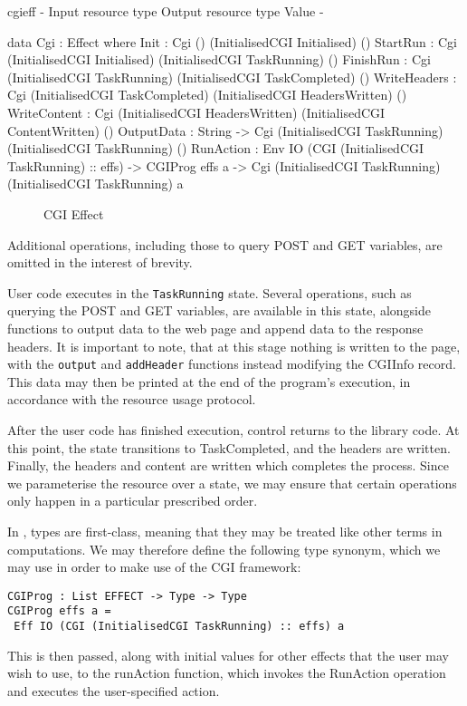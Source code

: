 \begin{SaveVerbatim}{cgieff}
{-                     { Input resource type }         { Output resource type }        { Value } -}

data Cgi : Effect where
    Init         : Cgi ()                              (InitialisedCGI Initialised)    ()
    StartRun     : Cgi (InitialisedCGI Initialised)    (InitialisedCGI TaskRunning)    ()
    FinishRun    : Cgi (InitialisedCGI TaskRunning)    (InitialisedCGI TaskCompleted)  ()
    WriteHeaders : Cgi (InitialisedCGI TaskCompleted)  (InitialisedCGI HeadersWritten) ()
    WriteContent : Cgi (InitialisedCGI HeadersWritten) (InitialisedCGI ContentWritten) ()
    OutputData   : String -> 
                   Cgi (InitialisedCGI TaskRunning)    (InitialisedCGI TaskRunning)    ()
    RunAction    : Env IO (CGI (InitialisedCGI TaskRunning) :: effs) -> CGIProg effs a -> 
                   Cgi (InitialisedCGI TaskRunning)    (InitialisedCGI TaskRunning)    a
\end{SaveVerbatim}

\begin{figure*}[t]
\begin{center}
\end{center}
\caption{CGI Effect}
\label{fig:cgieffect}
\end{figure*}

Additional operations, including those to query POST and GET variables, are omitted in the interest of brevity.

User code executes in the \texttt{TaskRunning} state. Several operations, such as querying the POST and GET variables, are available in this state, alongside functions to output data to the web page and append data to the response headers. It is important to note, that at this stage nothing is written to the page, with the \texttt{output} and \texttt{addHeader} functions instead modifying the CGIInfo record. This data may then be printed at the end of the program's execution, in accordance with the resource usage protocol.

After the user code has finished execution, control returns to the library code. At this point, the state transitions to TaskCompleted, and the headers are written.
Finally, the headers and content are written which completes the process. Since we parameterise the resource over a state, we may ensure that certain operations only happen in a particular prescribed order.

In \idris{}, types are first-class, meaning that they may be treated like other terms in computations. We may therefore define the following type synonym, which we may use in order to make use of the CGI framework: 
\begin{Verbatim}
CGIProg : List EFFECT -> Type -> Type
CGIProg effs a = 
 Eff IO (CGI (InitialisedCGI TaskRunning) :: effs) a
\end{Verbatim}
This is then passed, along with initial values for other effects that the user may wish to use, to the runAction function, which invokes the RunAction operation and executes the user-specified action.

